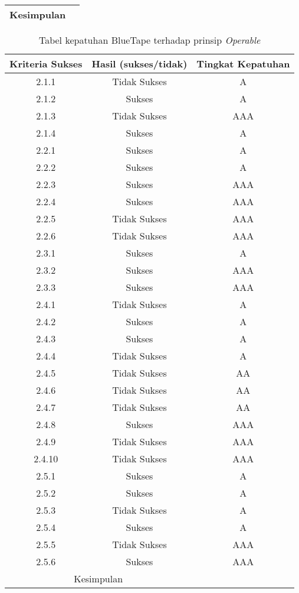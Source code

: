 \begin{table}[H]
\begin{tabular}{|c|c|c|}
        \bottomrule
        \multicolumn{2}{|c|}{Kesimpulan} &  \\
        \bottomrule

    \end{tabular}
\end{table}
\begin{table}[H]
    \centering 
    \caption{Tabel kepatuhan BlueTape terhadap prinsip \textit{Operable}}
    \label{tab:kepatuhan_bluetape_operable}
    \begin{tabular}{|c|c|c|}
        \toprule
        Kriteria Sukses & Hasil (sukses/tidak) & Tingkat Kepatuhan\\

        \midrule
        2.1.1 & Tidak Sukses & A \\
        2.1.2 & Sukses & A \\
        2.1.3 & Tidak Sukses & AAA \\
        2.1.4 & Sukses & A \\
        2.2.1 & Sukses & A \\
        2.2.2 & Sukses & A \\
        2.2.3 & Sukses & AAA \\
        2.2.4 & Sukses & AAA \\
        2.2.5 & Tidak Sukses & AAA \\
        2.2.6 & Tidak Sukses & AAA \\
        2.3.1 & Sukses & A \\
        2.3.2 & Sukses & AAA \\
        2.3.3 & Sukses & AAA \\
        2.4.1 & Tidak Sukses & A \\
        2.4.2 & Sukses & A \\
        2.4.3 & Sukses & A \\
        2.4.4 & Tidak Sukses & A \\
        2.4.5 & Tidak Sukses & AA \\
        2.4.6 & Tidak Sukses & AA \\
        2.4.7 & Tidak Sukses & AA \\
        2.4.8 & Sukses & AAA \\
        2.4.9 & Tidak Sukses & AAA \\
        2.4.10 & Tidak Sukses & AAA \\
        2.5.1 & Sukses & A \\
        2.5.2 & Sukses & A \\
        2.5.3 & Tidak Sukses & A \\
        2.5.4 & Sukses & A \\
        2.5.5 & Tidak Sukses & AAA \\
        2.5.6 & Sukses & AAA \\

        \bottomrule
        \multicolumn{2}{|c|}{Kesimpulan} &  \\
        \bottomrule

    \end{tabular}
\end{table}

